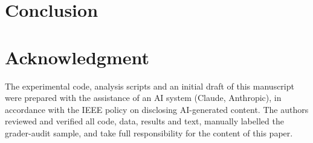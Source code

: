 \section{Conclusion}
\label{sec:conclusion}

\section*{Acknowledgment}
The experimental code, analysis scripts and an initial draft of this manuscript were prepared with the assistance of an AI system (Claude, Anthropic), in accordance with the IEEE policy on disclosing AI-generated content. The authors reviewed and verified all code, data, results and text, manually labelled the grader-audit sample, and take full responsibility for the content of this paper. 
